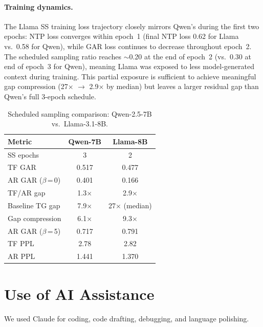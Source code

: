\paragraph{Training dynamics.}
The Llama SS training loss trajectory closely mirrors Qwen's during the first two epochs: NTP loss converges within epoch~1 (final NTP loss 0.62 for Llama vs.\ 0.58 for Qwen), while GAR loss continues to decrease throughout epoch~2. The scheduled sampling ratio reaches ${\sim}$0.20 at the end of epoch~2 (vs.\ 0.30 at end of epoch~3 for Qwen), meaning Llama was exposed to less model-generated context during training. This partial exposure is sufficient to achieve meaningful gap compression (27$\times$ $\to$ 2.9$\times$ by median) but leaves a larger residual gap than Qwen's full 3-epoch schedule.

\begin{table}[t]
\raggedright\small
\caption{Scheduled sampling comparison: Qwen-2.5-7B vs.\ Llama-3.1-8B.}
\label{tab:llama-vs-qwen-ss}
\begin{tabular}{@{}l cc@{}}
\toprule
\textbf{Metric} & \textbf{Qwen-7B} & \textbf{Llama-8B} \\
\midrule
SS epochs & 3 & 2 \\
TF GAR & 0.517 & 0.477 \\
AR GAR ($\beta$\,=\,0) & 0.401 & 0.166 \\
TF/AR gap & 1.3$\times$ & 2.9$\times$ \\
Baseline TG gap & 7.9$\times$ & 27$\times$ (median) \\
Gap compression & 6.1$\times$ & 9.3$\times$ \\
AR GAR ($\beta$\,=\,5) & 0.717 & 0.791 \\
TF PPL & 2.78 & 2.82 \\
AR PPL & 1.441 & 1.370 \\
\bottomrule
\end{tabular}
\end{table}

\section{Use of AI Assistance}
We used Claude for coding, code drafting, debugging, and language polishing.
